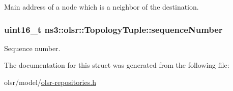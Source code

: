 Main address of a node which is a neighbor of the destination. 

\subsubsection[{\texorpdfstring{sequence\+Number}{sequenceNumber}}]{\setlength{\rightskip}{0pt plus 5cm}uint16\+\_\+t ns3\+::olsr\+::\+Topology\+Tuple\+::sequence\+Number}\hypertarget{structns3_1_1olsr_1_1TopologyTuple_a6f1ff68f2eaef28667bddeeb08c05fce}{}\label{structns3_1_1olsr_1_1TopologyTuple_a6f1ff68f2eaef28667bddeeb08c05fce}


Sequence number. 



The documentation for this struct was generated from the following file\+:\begin{DoxyCompactItemize}
\item 
olsr/model/\hyperlink{olsr-repositories_8h}{olsr-\/repositories.\+h}\end{DoxyCompactItemize}
